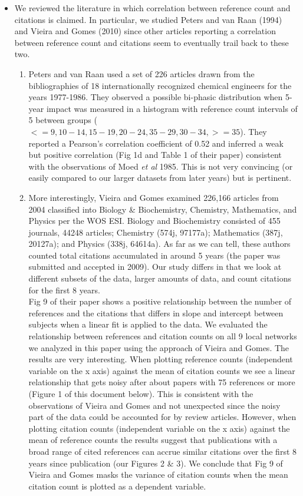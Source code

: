 \documentclass[11pt, oneside]{article}   	%
\begin{document}
\begin{itemize}
\item We reviewed the literature in which correlation between reference count and citations is claimed. In particular, we studied Peters and van Raan (1994) and Vieira and Gomes (2010) since other articles reporting a correlation between reference count and citations seem to eventually trail back to these two. 
\begin{enumerate}
\item Peters and van Raan used a set of 226 articles drawn from the bibliographies of 18 internationally recognized chemical engineers for the years 1977-1986. They observed a possible bi-phasic distribution when 5-year impact was measured in a histogram with reference count intervals of 5 between groups ($<=9, 10-14, 15-19, 20-24, 35-29, 30-34, >=35$). They reported a Pearson's correlation coefficient of 0.52 and inferred a weak but positive correlation (Fig 1d and Table 1 of their paper) consistent with the observations of Moed \emph{et al} 1985. This is not very convincing (or easily compared to our larger datasets from later years) but is pertinent. 

\item More interestingly, Vieira and Gomes examined 226,166 articles from 2004 classified into Biology \& Biochemistry, Chemistry, Mathematics, and Physics per the WOS ESI. Biology and Biochemistry consisted of 455 journals, 44248 articles; Chemistry (574j, 97177a); Mathematics (387j, 20127a); and Physics (338j, 64614a). As far as we can tell, these authors counted total citations accumulated in around 5 years (the paper was submitted and accepted in 2009).  Our study differs in that we look at different subsets of the data, larger amounts of data, and count citations for the first 8 years. \\
\vspace{3mm}
Fig 9 of their paper shows a positive relationship between the number of references and the citations that differs in slope and intercept between subjects when a linear fit is applied to the data.  We evaluated the relationship between references and citation counts on all 9 local networks we analyzed in this paper using the approach of Vieira and Gomes. The results are very interesting. When plotting reference counts (independent variable on the x axis) against the mean of citation counts we see a linear relationship that gets noisy after about papers with 75 references or more (Figure 1 of this document below). This is consistent with the observations of Vieira and Gomes and not unexpected since the noisy part of the data could be accounted for by review articles. However, when plotting citation counts (independent variable on the x axis) against the mean of reference counts the results suggest that publications with a broad range of cited references can accrue similar citations over the first 8 years since publication (our Figures 2 \& 3). We conclude that Fig 9 of Vieira and Gomes masks the variance of citation counts when the mean citation count is plotted as a dependent variable. 


\end{enumerate}
\end{itemize}
\end{document}
